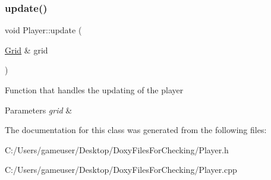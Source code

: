 \subsubsection{\texorpdfstring{update()}{update()}}
{\footnotesize\ttfamily void Player\+::update (\begin{DoxyParamCaption}\item[{\mbox{\hyperlink{class_grid}{Grid}} \&}]{grid }\end{DoxyParamCaption})}



Function that handles the updating of the player 


\begin{DoxyParams}{Parameters}
{\em grid} & \\
\hline
\end{DoxyParams}


The documentation for this class was generated from the following files\+:\begin{DoxyCompactItemize}
\item 
C\+:/\+Users/gameuser/\+Desktop/\+Doxy\+Files\+For\+Checking/Player.\+h\item 
C\+:/\+Users/gameuser/\+Desktop/\+Doxy\+Files\+For\+Checking/Player.\+cpp\end{DoxyCompactItemize}
